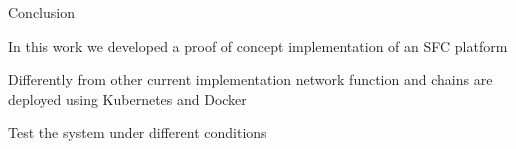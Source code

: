 \begin{frame}{Conclusion}

\vfill{}

In this work we developed a proof of concept implementation of an SFC platform

\vfill{}

Differently from other current implementation network function and chains are
deployed using Kubernetes and Docker

\vfill{}

Test the system under different conditions

\vfill{}

\end{frame}